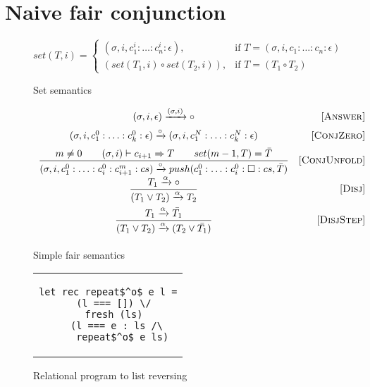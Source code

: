 \section{Naive fair conjunction}

\begin{figure}[h!]
\[
set(T, i) =
\left\{
\begin{array}{rl}
(\sigma, i, c_1^i : \ldots : c_n^i : \epsilon), & \mbox{if } T = (\sigma, i, c_1 : \ldots : c_n : \epsilon) \\
(set(T_1, i) \circ set(T_2, i)), & \mbox{if } T = (T_1 \circ T_2)
\end{array}
\right.
\]
\caption{Set semantics}
\label{fair:set-semantics}
\end{figure}

\begin{figure}[h!]
\[\begin{array}{cr}

      {(\sigma, i, \epsilon) \xrightarrow{(\sigma, i)} \circ}  
&     \mbox{[\textsc{Answer}]} \\[2mm]
      {(\sigma, i, c_1^0 : \ldots : c_k^0 : \epsilon) \xrightarrow{\circ} (\sigma, i, c_1^N : \ldots : c_k^N : \epsilon)}
&     \mbox{[\textsc{ConjZero}]} \\[2mm]
\dfrac{m \not= 0 \qquad (\sigma, i) \vdash c_{i+1} \Rightarrow T \qquad set(m - 1, T) = \bar{T}}
      {(\sigma, i, c_1^0 : \ldots : c_i^0 : c_{i+1}^m : cs) \xrightarrow{\circ} push(c_1^0 : \ldots : c_i^0 : \Box : cs, \bar{T})}
&     \mbox{[\textsc{ConjUnfold}]} \\[2mm]
\dfrac{T_1 \xrightarrow{\alpha} \circ}
      {(T_1 \lor T_2) \xrightarrow{\alpha} T_2}
&     \mbox{[\textsc{Disj}]} \\[4mm]
\dfrac{T_1 \xrightarrow{\alpha} \bar{T_1}}
      {(T_1 \lor T_2) \xrightarrow{\alpha} (T_2 \lor\bar{T_1})}
&     \mbox{[\textsc{DisjStep}]} \\[4mm]
\end{array}\]
\caption{Simple fair semantics}
\label{fair:naive-semantics}
\end{figure}

\begin{figure}
\centering
\begin{tabular}{c}
\begin{lstlisting}
let rec repeat$^o$ e l =
  (l === []) \/
  fresh (ls)
    (l === e : ls /\ 
     repeat$^o$ e ls)
\end{lstlisting}
\end{tabular}

\caption{Relational program to list reversing}
\label{fair:lst-repeato}
\end{figure}

\FloatBarrier

